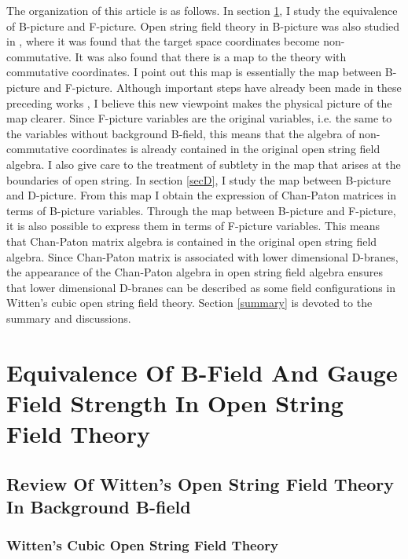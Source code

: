 \documentclass[a4paper,12pt]{article}
\begin{document}
The organization of this article is as follows.
In section \ref{secBF},
I study the equivalence of
B-picture and F-picture.
Open string field theory
in B-picture was also studied
in \cite{Sgi,KT1,KT2}, where
it was found that 
the target space coordinates
become non-commutative.
It was also found 
that there is a map 
to the theory with commutative coordinates.
I point out this map is essentially the map
between B-picture and F-picture.
Although important steps have already been made in
these preceding works \cite{Sgi,KT1,KT2}, I believe
this new viewpoint makes the physical picture
of the map clearer.
Since F-picture variables
are the original variables, i.e.
the same to the variables without background
B-field,
this means that
the algebra of non-commutative
coordinates
is already contained
in the original open string field algebra.
I also give care to the treatment of subtlety in
the map
that arises at the boundaries of open string.
In section \ref{secD},
I study the map between
B-picture and D-picture.
From this map I obtain
the expression of
Chan-Paton matrices 
in terms of B-picture variables.
Through the map between B-picture and F-picture,
it is also possible to express them
in terms of F-picture variables.
This means that
Chan-Paton matrix algebra
is contained in the original
open string field algebra.
Since Chan-Paton matrix
is associated with lower dimensional D-branes, 
the appearance of the Chan-Paton algebra
in open string field algebra ensures
that lower dimensional D-branes can be described as some
field configurations 
in Witten's cubic open string field theory.
Section \ref{summary} is devoted to the summary and discussions.

\section{Equivalence Of B-Field And
Gauge Field Strength
In Open String Field Theory}\label{secBF}

\subsection{Review Of Witten's Open String Field Theory
In Background B-field}

\subsubsection*{Witten's Cubic Open String Field Theory}
\end{document}
